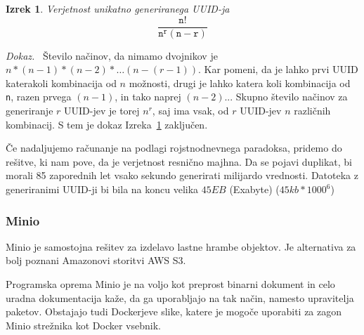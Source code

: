 \documentclass[a4paper, 12pt]{book}
\newtheorem{izrek}{Izrek}[chapter]
\newenvironment{dokaz}{\emph{Dokaz.}\ }{\hspace{\fill}{$\Box$}}
\begin{document}
\begin{izrek}
\label{iz:1}
Verjetnost unikatno generiranega UUID-ja
\begin{equation}
\mathtt{\frac{n!}{n^{r}(n-r)}}
\label{eq:1}
\end{equation}
\end{izrek}

\begin{dokaz}
Število načinov, da nimamo dvojnikov je $n*(n-1)*(n-2)* …(n-(r-1))$. Kar pomeni, da je lahko prvi UUID katerakoli kombinacija od $n$ možnosti, drugi je lahko katera koli kombinacija od \verb=n=, razen prvega $(n-1)$, in tako naprej $(n-2)$... Skupno število načinov za generiranje $r$ UUID-jev je torej $n^r$, saj ima vsak, od $r$ UUID-jev $n$ različnih kombinacij.
S tem je dokaz Izreka~\ref{iz:1} zaključen.
\end{dokaz}

Če nadaljujemo računanje na podlagi rojstnodnevnega paradoksa, pridemo do rešitve, ki nam pove, da je verjetnost resnično majhna. Da se pojavi duplikat, bi morali 85 zaporednih let vsako sekundo generirati milijardo vrednosti. Datoteka z generiranimi UUID-ji bi bila na koncu velika $45EB$ (Exabyte) ($45kb*1000^6$) \cite{uuid-collisions}






\subsubsection{Minio}
\label{minio-what}
Minio je samostojna rešitev za izdelavo lastne hrambe objektov. Je alternativa za bolj poznani Amazonovi storitvi AWS S3.

Programska oprema Minio je na voljo kot preprost binarni dokument in celo uradna dokumentacija kaže, da ga uporabljajo na tak način, namesto upravitelja paketov. Obstajajo tudi Dockerjeve slike, katere je mogoče uporabiti za zagon Minio strežnika kot Docker vsebnik.
\end{document}
